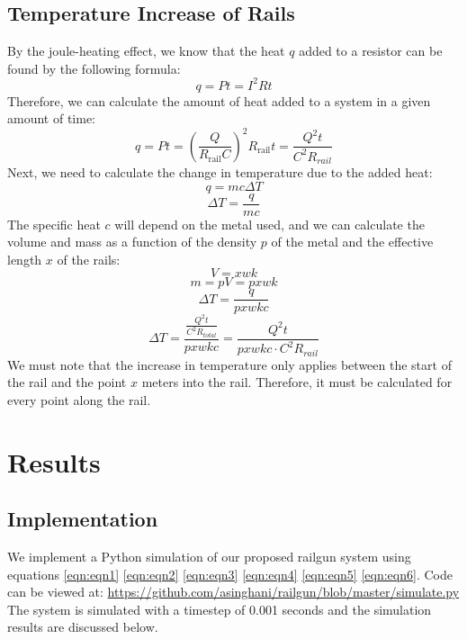 \documentclass[12pt]{article}
\begin{document}
\subsection{Temperature Increase of Rails}
By the joule-heating effect, we know that the heat $q$ added to a resistor can be found by the following formula:
\begin{equation}
    q = Pt = I^2 R t 
\end{equation}
Therefore, we can calculate the amount of heat added to a system in a given amount of time:
\begin{equation}
    q = Pt = \left(\frac{Q}{R_{\text{rail}}C}\right)^2 R_{\text{rail}} t = \frac{Q^2 t}{C^2 R_{rail}}
\end{equation}
Next, we need to calculate the change in temperature due to the added heat:
\begin{equation}
    q = mc\Delta T
\end{equation}
\begin{equation}
    \Delta T = \frac{q}{mc}
\end{equation}
The specific heat $c$ will depend on the metal used, and we can calculate the volume and mass as a function of the density $p$ of the metal and the effective length $x$ of the rails:
\begin{equation}
    V = xwk
\end{equation}
\begin{equation}
    m = pV = pxwk
\end{equation}
\begin{equation}
    \Delta T = \frac{q}{pxwkc}
\end{equation}
\begin{equation}
    \Delta T = \frac{\frac{Q^2 t}{C^2 R_{total}}}{pxwkc} = \frac{Q^2 t}{pxwkc \cdot C^2 R_{rail}}
    \label{eqn:eqn6}
\end{equation}
We must note that the increase in temperature only applies between the start of the rail and the point $x$ meters into the rail. Therefore, it must be calculated for every point along the rail.

\section{Results}

\subsection{Implementation}
We implement a Python simulation of our proposed railgun system using equations \eqref{eqn:eqn1} \eqref{eqn:eqn2} \eqref{eqn:eqn3} \eqref{eqn:eqn4} \eqref{eqn:eqn5} \eqref{eqn:eqn6}. Code can be viewed at: \url{https://github.com/asinghani/railgun/blob/master/simulate.py} \\
The system is simulated with a timestep of 0.001 seconds and the simulation results are discussed below.
\end{document}
